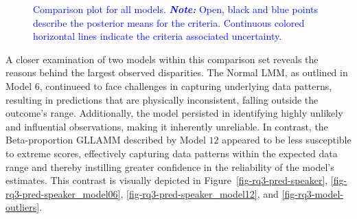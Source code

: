 \documentclass[
  authoryear,
  preprint,
  1p]{elsarticle}
\begin{document}
\label{cell-fig-rq3-waic-psis}
\begin{figure}[H]


\caption{\label{fig-rq3-waic-psis}\textcolor{blue}{Comparison plot for all models.
\textbf{\emph{Note:}} Open, black and blue points describe the posterior
means for the criteria. Continuous colored horizontal lines indicate the
criteria associated uncertainty.}}

\end{figure}%

A closer examination of two models within this comparison set reveals
the reasons behind the largest observed disparities. The Normal LMM, as
outlined in Model \(6\), continueed to face challenges in capturing
underlying data patterns, resulting in predictions that are physically
inconsistent, falling outside the outcome's range. Additionally, the
model persisted in identifying highly unlikely and influential
observations, making it inherently unreliable. In contrast, the
Beta-proportion GLLAMM described by Model \(12\) appeared to be less
susceptible to extreme scores, effectively capturing data patterns
within the expected data range and thereby instilling greater confidence
in the reliability of the model's estimates. This contrast is visually
depicted in Figure~\ref{fig-rq3-pred-speaker},
\ref{fig-rq3-pred-speaker_model06}, \ref{fig-rq3-pred-speaker_model12},
and \ref{fig-rq3-model-outliers}.
\end{document}

